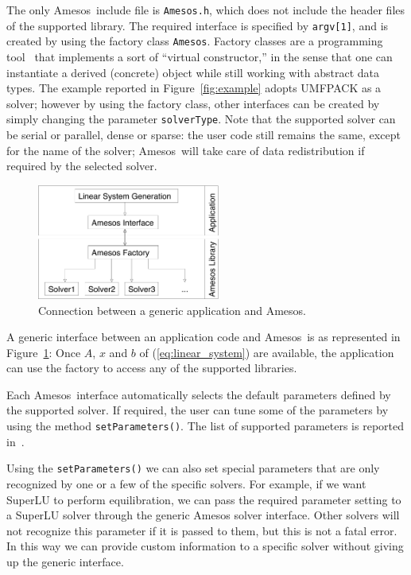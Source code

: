 \documentclass[acmtoms,acmnow]{acmtrans2m}
\newcommand{\amesos}{{\sc Amesos}}
\begin{document}
The only \amesos\ include file is \verb!Amesos.h!, which does not include the
header files of the supported library. The required interface is specified by
\verb!argv[1]!, and is created by using the factory
class \verb!Amesos!. Factory classes are a programming
tool~\cite{alexandrescu01modern} that implements a sort of ``virtual
constructor,'' in the sense that one can instantiate a derived (concrete)
object while still working with abstract data types. The example reported in
Figure~\ref{fig:example} adopts UMFPACK as a solver; however by using the
factory class, other interfaces can be created by simply changing the
parameter {\tt solverType}. Note that the supported solver can be serial or
parallel, dense or sparse: the user code still remains the same, except for
the name of the solver; \amesos\ will take care of data redistribution if
required by the selected solver.

\begin{figure}
\begin{center}
\includegraphics[width=6cm]{amesos_and_application.pdf}
\end{center}
\caption{Connection between a generic application and \amesos.}
\label{fig:app}
\end{figure}

A generic interface between an application code and \amesos\ is as
represented in Figure~\ref{fig:app}: Once $A$, $x$ and $b$ of
(\ref{eq:linear_system}) are available, the application can use the
factory to access any of the supported libraries.

Each \amesos\ interface automatically selects the default parameters
defined by the supported solver. If required, the user can tune some
of the parameters by using the method \verb!setParameters()!. The
list of supported parameters is reported
in~\cite{Amesos-Reference-Guide}.

Using the \verb!setParameters()! we can also set special parameters
that are only recognized by one or a few of the specific solvers.
For example, if we want SuperLU to perform equilibration, we can
pass the required parameter setting to a SuperLU solver through the
generic Amesos solver interface.  Other solvers will not recognize
this parameter if it is passed to them, but this is not a fatal
error.  In this way we can provide custom information to a specific
solver without giving up the generic interface.
\end{document}
